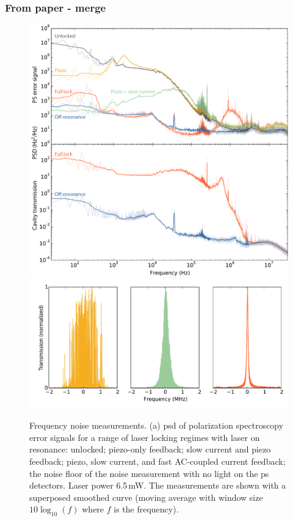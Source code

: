 \subsubsection{From paper - merge}
\begin{figure}[htbp]
\centering
    \includegraphics[width=0.9\linewidth]{chapter1/Figs/fig4a_v3.pdf}
    \label{fig:PSDs}
    \includegraphics[width=0.9\linewidth]{chapter1/Figs/fig4b_v1.pdf}
    \label{fig:cavity_scans}
\caption{Frequency noise measurements.
(a) \Gls*{psd} of polarization spectroscopy error signals for a range of laser locking regimes with laser on resonance: unlocked; piezo-only feedback; slow current and piezo feedback; piezo, slow current, and fast AC-coupled current feedback; the noise floor of the noise measurement with no light on the \gls*{ps} detectors.
Laser power 6.5\,mW.
The measurements are shown with a superposed smoothed curve (moving average  with window size $10\log_{10}(f)$ where $f$ is the frequency).
}
\end{figure}
